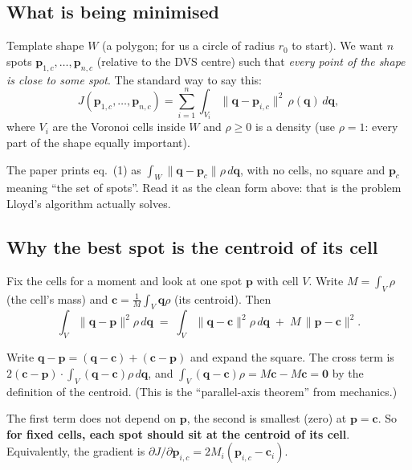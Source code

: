 \documentclass[11pt,a4paper]{article}
\newcommand{\vect}[1]{\mathbf{#1}}
\begin{document}
\subsection{What is being minimised}
Template shape $W$ (a polygon; for us a circle of radius $r_0$ to start). We want $n$ spots $\vect{p}_{1,c},\dots,
\vect{p}_{n,c}$ (relative to the DVS centre) such that \emph{every point of the shape is close to some spot}. The
standard way to say this:
\begin{equation}
J(\vect{p}_{1,c},\dots,\vect{p}_{n,c})=\sum_{i=1}^{n}\int_{V_i}\|\vect{q}-\vect{p}_{i,c}\|^2\,\rho(\vect{q})\,d\vect{q},
\tag{1, clean form}
\end{equation}
where $V_i$ are the Voronoi cells inside $W$ and $\rho\ge0$ is a density (use $\rho=1$: every part of the shape
equally important).

\begin{watchbox}
The paper prints eq.~(1) as $\int_W\|\vect{q}-\vect{p}_c\|\rho\,d\vect{q}$, with no cells, no square and $\vect{p}_c$
meaning ``the set of spots''. Read it as the clean form above: that is the problem Lloyd's algorithm actually solves.
\end{watchbox}

\subsection{Why the best spot is the centroid of its cell}
Fix the cells for a moment and look at one spot $\vect{p}$ with cell $V$. Write $M=\int_V\rho$ (the cell's mass) and
$\vect{c}=\frac1M\int_V\vect{q}\rho$ (its centroid). Then
\begin{equation}
\int_V\|\vect{q}-\vect{p}\|^2\rho\,d\vect{q}\;=\;\int_V\|\vect{q}-\vect{c}\|^2\rho\,d\vect{q}\;+\;M\,\|\vect{p}-\vect{c}\|^2 .
\label{eq:parallel}
\end{equation}
\begin{whybox}
Write $\vect{q}-\vect{p}=(\vect{q}-\vect{c})+(\vect{c}-\vect{p})$ and expand the square. The cross term is
$2(\vect{c}-\vect{p})\cdot\int_V(\vect{q}-\vect{c})\rho\,d\vect{q}$, and
$\int_V(\vect{q}-\vect{c})\rho=M\vect{c}-M\vect{c}=\vect{0}$ by the definition of the centroid. (This is the
``parallel-axis theorem'' from mechanics.)
\end{whybox}
The first term does not depend on $\vect{p}$, the second is smallest (zero) at $\vect{p}=\vect{c}$. So \textbf{for
fixed cells, each spot should sit at the centroid of its cell}. Equivalently, the gradient is
$\partial J/\partial\vect{p}_{i,c}=2M_i(\vect{p}_{i,c}-\vect{c}_i)$.
\end{document}
